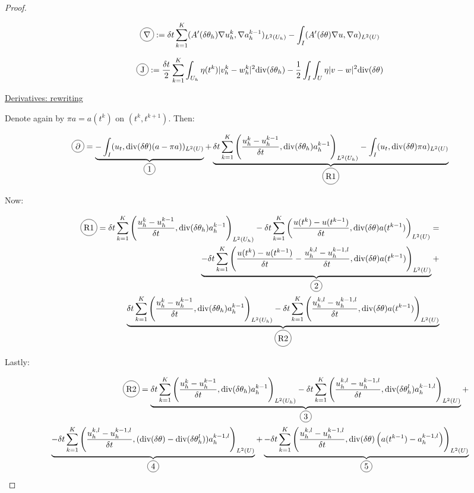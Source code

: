 \documentclass[english,a4paper,9pt,oneside]{scrbook}	%
\theoremstyle{break}
\newenvironment{mproof}[1][\proofname]{%
  \begin{proof}[#1]$ $\par\nobreak\ignorespaces
}{%
  \end{proof}
}
\renewcommand*{\proofname}{Proof}
\theoremstyle{remark}
\newcommand{\te}{\theta}
\newcommand{\dive}{\text{div}}
\newcommand*\circled[1]{\tikz[baseline=(char.base)]{
            \node[shape=circle,draw,inner sep=2pt] (char) {#1};}}
\begin{document}
\begin{mproof}
\begin{align*}
	\circled{$\nabla$} := \delta t \sum_{k=1}^{K} (A'(\delta \theta_h ) \nabla u_h^k, \nabla a_h^{k-1})_{L^2(U_h)} - \int_I (A'(\delta\te )\nabla u, \nabla a)_{L^2(U)}
\end{align*}

\begin{align*}
	\circled{J}:=\frac{\delta t}{2} \sum_{k=1}^{K} \int_{U_h} \eta(t^k)|v_h^k-w_h^k|^2  \dive(\delta \theta_h ) - \frac{1}{2}\int_I\int_{U}\eta |v-w|^2\dive(\delta \te)
\end{align*}

\underline{Derivatives: rewriting}

Denote again by $\pi a = a(t^k)$ on $(t^k,t^{k+1})$. Then:

\begin{align*}
	\circled{$\partial$}=\underbrace{- \int_I (u_t , \dive(\delta \te) (a -\pi a))_{L^2(U)}}_{\circled{1}}+ \underbrace{\delta t \sum_{k=1}^{K} \left (\frac{u_h^{k}-u_h^{k-1}}{\delta t}, \dive(\delta \theta_h ) a_h^{k-1} \right )_{L^2(U_h)} - \int_I (u_t , \dive(\delta \te) \pi a)_{L^2(U)}}_{\circled{R1}}
\end{align*}

Now:

\begin{align*}
	\circled{R1} = \delta t \sum_{k=1}^{K} \left (\frac{u_h^{k}-u_h^{k-1}}{\delta t}, \dive(\delta \theta_h ) a_h^{k-1} \right )_{L^2(U_h)} - \delta t \sum_{k=1}^{K}\left (\frac{u(t^{k})-u(t^{k-1})}{\delta t} , \dive(\delta \te)  a(t^{k-1})\right )_{L^2(U)}=\\
\underbrace{- \delta t \sum_{k=1}^{K}\left (\frac{u(t^{k})-u(t^{k-1})}{\delta t} -\frac{u^{k,l}_h-u^{k-1,l}_h}{\delta t} , \dive(\delta \te)  a(t^{k-1})\right )_{L^2(U)}}_{\circled{2}}+\\ \underbrace{\delta t \sum_{k=1}^{K} \left (\frac{u_h^{k}-u_h^{k-1}}{\delta t}, \dive(\delta \theta_h ) a_h^{k-1} \right )_{L^2(U_h)}- \delta t \sum_{k=1}^{K}\left (\frac{u^{k,l}_h-u^{k-1,l}_h}{\delta t} , \dive(\delta \te)  a(t^{k-1})\right )_{L^2(U)}}_{\circled{R2}} 
\end{align*}

Lastly:

\begin{align*}
	\circled{R2} = \underbrace{\delta t \sum_{k=1}^{K} \left (\frac{u_h^{k}-u_h^{k-1}}{\delta t}, \dive(\delta \theta_h ) a_h^{k-1} \right )_{L^2(U_h)}
		- \delta t \sum_{k=1}^{K}\left (\frac{u^{k,l}_h-u^{k-1,l}_h}{\delta t} , \dive(\delta \te_h^l)  a_h^{k-1,l}\right )_{L^2(U)} }_{\circled{3}}+ \\
	\underbrace{- \delta t \sum_{k=1}^{K}\left (\frac{u^{k,l}_h-u^{k-1,l}_h}{\delta t} , (\dive(\delta \te) - \dive(\delta \te_h^l)  )a_h^{k-1,l}\right )_{L^2(U)}}_{\circled{4}} + \underbrace{- \delta t \sum_{k=1}^{K}\left (\frac{u^{k,l}_h-u^{k-1,l}_h}{\delta t} , \dive(\delta \te) \left(a(t^{k-1})-a_h^{k-1,l}\right)\right )_{L^2(U)}}_{\circled{5}}
\end{align*}


\end{mproof}
\end{document}
